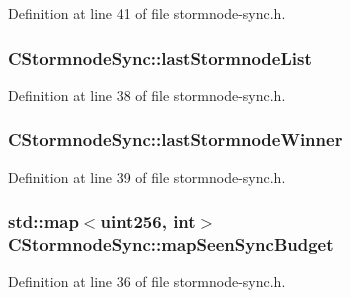 Definition at line 41 of file stormnode-\/sync.\+h.

\hypertarget{class_c_stormnode_sync_aeb0a6f0e92f6f1f25c5d9fa6c2b15bbd}{}
\subsubsection[{last\+Stormnode\+List}]{ C\+Stormnode\+Sync\+::last\+Stormnode\+List}\label{class_c_stormnode_sync_aeb0a6f0e92f6f1f25c5d9fa6c2b15bbd}


Definition at line 38 of file stormnode-\/sync.\+h.

\hypertarget{class_c_stormnode_sync_a84ac2bc44ac623f8e679f2ba58034c7a}{}
\subsubsection[{last\+Stormnode\+Winner}]{ C\+Stormnode\+Sync\+::last\+Stormnode\+Winner}\label{class_c_stormnode_sync_a84ac2bc44ac623f8e679f2ba58034c7a}


Definition at line 39 of file stormnode-\/sync.\+h.

\hypertarget{class_c_stormnode_sync_a7555b263aa695f48c81f4051c1a4788c}{}
\subsubsection[{map\+Seen\+Sync\+Budget}]{\setlength{\rightskip}{0pt plus 5cm}std\+::map$<${\bf uint256}, int$>$ C\+Stormnode\+Sync\+::map\+Seen\+Sync\+Budget}\label{class_c_stormnode_sync_a7555b263aa695f48c81f4051c1a4788c}


Definition at line 36 of file stormnode-\/sync.\+h.

\hypertarget{class_c_stormnode_sync_ab5874fbd02e921572983d1530cc7d69e}{}
